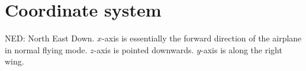 \section{Coordinate system}
NED: North East Down.
$x$-axis is essentially the forward direction of the airplane in normal flying mode.
$z$-axis is pointed downwards.
$y$-axis is along the right wing.